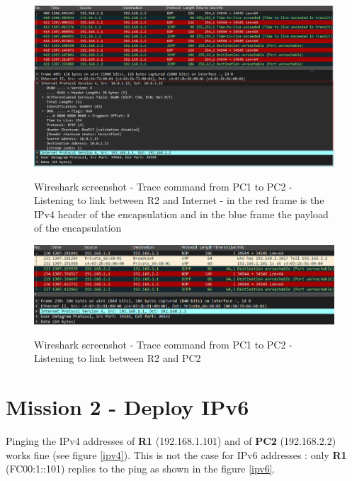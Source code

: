 \documentclass[10pt,a4paper]{ULBreport}
\begin{document}
\begin{figure}[H]
    \caption{Wireshark screenshot - Trace command from PC1 to PC2 - Listening to link between R2 and Internet - in the red frame is the IPv4 header of the encapsulation and in the blue frame the payload of the encapsulation }
    \centering
    \includegraphics[width=\textwidth]{Images/traceWireR2Int.png}
    \label{R2Int}
\end{figure}

\begin{figure}[H]
    \caption{Wireshark screenshot - Trace command from PC1 to PC2 - Listening to link between R2 and PC2}
    \centering
    \includegraphics[width=\textwidth]{Images/traceWireR2PC2.png}
    \label{R2PC2}
\end{figure}

\chapter{Mission 2 - Deploy IPv6}




Pinging the IPv4 addresses of \textbf{R1} (192.168.1.101) and of \textbf{PC2} (192.168.2.2) works fine (see figure \ref{ipv4}). This is not the case for IPv6 addresses :  only \textbf{R1} (FC00:1::101) replies to the ping as shown in the figure \ref{ipv6}.
\end{document}
